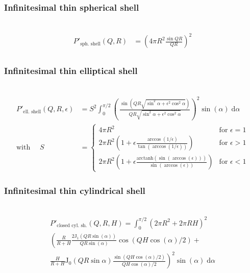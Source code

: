 \subsubsection{Infinitesimal thin spherical shell}
\label{subsubsect:ThinSphShell}
\hspace{1pt} \\
\begin{align}
P'_\text{sph. shell}(Q,R) &= \left(4\pi R^2\frac{\sin QR}{QR}\right)^2 \\
\end{align}

\subsubsection{Infinitesimal thin elliptical shell}
\label{subsubsect:ThinEllShell}
\hspace{1pt} \\
\begin{align}
P'_\text{ell. shell}(Q,R,\epsilon) &= S^2 \int_0^{\pi/2}
\left(\,\frac{\sin\left( QR\sqrt{\sin^2\alpha+\epsilon^2\cos^2\alpha}\right)}{QR\sqrt{\sin^2\alpha+\epsilon^2\cos^2\alpha}}\right)^2 \sin(\alpha) \;\mathrm{d}\alpha \\
\mbox{with } \quad S &=
\begin{cases}
4\pi R^2 & \mbox{for } \epsilon = 1 \\
2 \pi R^2 \left(1+\epsilon \frac{\arccos(1/\epsilon)}{\tan\left(\arccos(1/\epsilon)\right)} \right)& \mbox{for } \epsilon > 1 \\
2 \pi R^2 \left(1+\epsilon \frac{\mathrm{arctanh}\left(\sin(\arccos(\epsilon))\right)}{\sin\left(\arccos(\epsilon)\right)} \right)& \mbox{for } \epsilon < 1
\end{cases}
\end{align}

\subsubsection{Infinitesimal thin cylindrical shell}
\label{subsubsect:ThinCylShell}
\hspace{1pt} \\
\begin{multline}
P'_\text{closed cyl. sh.}(Q,R,H) = \int_0^{\pi/2}\left(2 \pi R^2+2 \pi R H\right)^2 \\
\left(\frac{R}{R+H}
\frac{2\mathrm{J}_1\left(QR\sin(\alpha)\right)}{QR\sin(\alpha)} \cos(QH\cos(\alpha)/2) + \right.\\
\left.
\frac{H}{R+H}\mathrm{J}_0(QR\sin{\alpha})\frac{\sin(QH\cos(\alpha)/2)}{QH\cos(\alpha)/2}\right)^2\sin(\alpha) \; \mathrm{d}\alpha
\end{multline}



